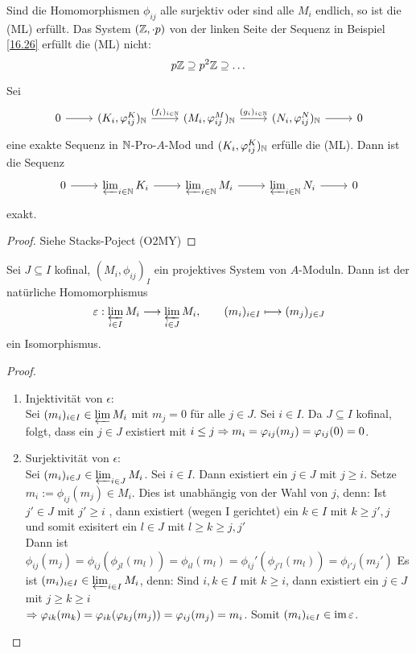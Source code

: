 \begin{anm}
	Sind die Homomorphismen $\phi_{ij} $ alle surjektiv oder sind alle $M_i$ endlich, so ist die (ML) erfüllt. Das System $(\Z, \cdot p) $ von der linken Seite der Sequenz in Beispiel \ref{16.26} erfüllt die (ML) nicht: 
	$$ p\Z \supseteq p^2 \Z \supseteq \dots $$
\end{anm}
\begin{bem} \label{16.28}
	Sei 
	$$\begin{tikzcd}  0 \arrow{r} & (K_i, \phi_{ij}^K)_{\N} \arrow{r}{(f_i)_{i \in \N}} & (M_i, \phi_{ij}^M)_{\N} \arrow{r}{(g_i)_{i \in \N}} & (N_i, \phi_{ij}^N)_{\N} \arrow{r} &  0 \end{tikzcd}$$
	eine exakte Sequenz in $\N$-Pro-$A$-Mod und $(K_i, \phi_{ij}^K)_{\N} $ erfülle die (ML). Dann ist die Sequenz 
	$$ \begin{tikzcd}  0 \arrow{r} & \varprojlim_{i\in \N} K_i \arrow{r} & \varprojlim_{i\in \N} M_i  \arrow{r} & \varprojlim_{i\in \N} N_i \arrow{r} &  0 \end{tikzcd}$$
	exakt. 
\end{bem}
\begin{proof}
	Siehe Stacks-Poject (O2MY)
\end{proof}
\begin{bem} \label{16.29}
	Sei $J \subseteq I $ kofinal, $(M_i, \phi_{ij})_I $ ein projektives System von $A$-Moduln. Dann ist der natürliche Homomorphismus
	$$ \epsilon: \varprojlim_{i \in I } M_i \longrightarrow \varprojlim_{i \in J} M_i, \qquad (m_i)_{i \in I } \longmapsto (m_j)_{j \in J } $$ 
	ein Isomorphismus. 
\end{bem}
\begin{proof}
	\begin{enumerate} 
		\item[] Injektivität von $\epsilon$: \\ Sei $(m_i)_{i \in I} \in \varprojlim M_i $ mit $ m_j = 0 $ für alle $j \in J $. Sei $i \in I$. Da $J \subseteq I $ kofinal, folgt, dass ein $j \in J $ existiert mit $ i \leq j \Ra m_i = \phi_{ij}(m_j)= \phi_{ij}(0) = 0$.
		\item[] Surjektivität von $\epsilon$: \\ Sei $(m_i)_{i \in J} \in \varprojlim_{i\in J} M_i$. Sei $i \in I $. Dann existiert ein $ j \in J $ mit $j \geq i$. Setze $m_i:= \phi_{ij}(m_j) \in M_i$. Dies ist unabhängig von der Wahl von $j$, denn: Ist $j' \in J $ mit $ j' \geq i $ , dann existiert (wegen I gerichtet) ein $k \in I $ mit $k \geq j',j $ und somit exisitert ein $l \in J $ mit $l \geq k \geq j,j' $ \\
		Dann ist $ \phi_{ij}(m_j) = \phi_{ij}(\phi_{jl}(m_l)) = \phi_{il}(m_l)=\phi_{ij}'(\phi_{j'l}(m_l)) = \phi_{i'j}(m_j') $ Es ist $(m_i)_{i \in I} \in \varprojlim_{i \in I } M_i$, denn: Sind $i,k \in I $ mit $k\geq i $, dann existiert ein $j \in J $ mit $j \geq k \geq i $ \\
		$\Ra \phi_{ik}(m_k) = \phi_{ik}(\phi_{kj}(m_j)) = \phi_{ij}(m_j) = m_i$. Somit $(m_i)_{i \in I } \in \im \epsilon $.
	\end{enumerate}
\end{proof}
\newpage 
